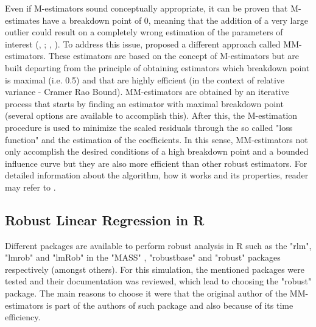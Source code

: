 \documentclass[a4paper]{article}
\begin{document}
Even if M-estimators sound conceptually appropriate, it can be proven that M-estimates have a breakdown point of 0, meaning that the addition of a very large outlier could result on a completely wrong estimation of the parameters of interest (\citeauthor{ruckstuhl2016}, \citeyear{ruckstuhl2016}; \citeauthor{wilcox2016}, \citeyear{wilcox2016}).
To address this issue, \citet{yohai1987} proposed a different approach called MM-estimators. These estimators are based on the concept of M-estimators but are built departing from the principle of obtaining estimators which breakdown point is maximal (i.e. 0.5) and that are highly efficient (in the context of relative variance - Cramer Rao Bound). MM-estimators are obtained by an iterative process that starts by finding an estimator with maximal breakdown point (several options are available to accomplish this). After this, the M-estimation procedure is used to minimize the scaled residuals through the so called "loss function" and the estimation of the coefficients. In this sense, MM-estimators not only accomplish the desired conditions of a high breakdown point and a bounded influence curve but they are also more efficient than other robust estimators. For detailed information about the algorithm, how it works and its properties, reader may refer to \citet{yohai1987}.


\subsection{Robust Linear Regression in R} \label{robustregression}
Different packages are available to perform robust analysis in R \citep{rsoftware} such as the "rlm", "lmrob"  and "lmRob" in the "MASS" \citep{masslibrary}, "robustbase" \citep{robustbase} and "robust" \citep{robustpackage} packages respectively (amongst others).  For this simulation, the mentioned packages were tested and their documentation was reviewed, which lead to choosing the "robust" package. The main reasons to choose it were that the original author of the MM-estimators is part of the authors of such package and also because of its time efficiency. 
\end{document}
